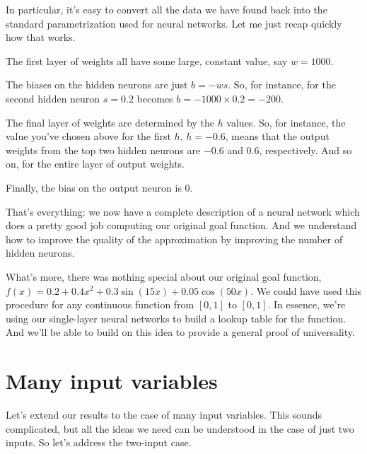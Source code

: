 \documentclass[a4paper,twoside,10pt]{book}
\begin{document}
In particular, it's easy to convert all the data we have found back into the standard parametrization used for neural networks. Let me just recap quickly how that works.

The first layer of weights all have some large, constant value, say $w=1000$.

The biases on the hidden neurons are just $b=-ws$. So, for instance, for the second hidden neuron $s=0.2$ becomes $b=-1000\times0.2=-200$.

The final layer of weights are determined by the $h$ values. So, for instance, the value you've chosen above for the first $h$, $h= -0.6$, means that the output weights from the top two hidden neurons are $-0.6$ and 0.6, respectively. And so on, for the entire layer of output weights.

Finally, the bias on the output neuron is 0.

That's everything: we now have a complete description of a neural network which does a pretty good job computing our original goal function. And we understand how to improve the quality of the approximation by improving the number of hidden neurons.

What's more, there was nothing special about our original goal function, $f(x)=0.2+0.4x^2+0.3\sin(15x)+0.05\cos(50x)$. We could have used this procedure for any continuous function from $[0,1]$ to $[0,1]$. In essence, we're using our single-layer neural networks to build a lookup table for the function. And we'll be able to build on this idea to provide a general proof of universality.

\section{Many input variables}
Let's extend our results to the case of many input variables. This sounds complicated, but all the ideas we need can be understood in the case of just two inputs. So let's address the two-input case.
\end{document}
